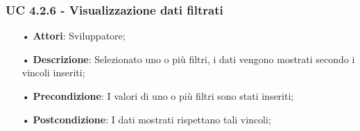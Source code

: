 \subsubsection{UC 4.2.6 - Visualizzazione dati filtrati}
\begin{itemize}
\item[•]\textbf{Attori}: Sviluppatore;
\item[•]\textbf{Descrizione}: Selezionato uno o più filtri, i dati vengono mostrati secondo i vincoli inseriti;
\item[•]\textbf{Precondizione}: I valori di uno o più filtri sono stati inseriti;
\item[•]\textbf{Postcondizione}: I dati mostrati rispettano tali vincoli;
\end{itemize}
